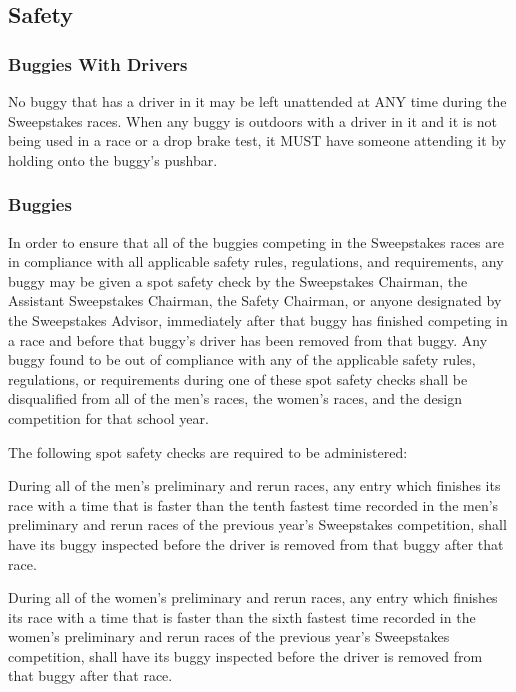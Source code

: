 \subsection{Safety}

\subsubsection{Buggies With Drivers}

No buggy that has a driver in it may be left unattended at ANY time during the Sweepstakes races. When any buggy is outdoors with a driver in it and it is not being used in a race or a drop brake test, it MUST have someone attending it by holding onto the buggy's pushbar.

\subsubsection{Buggies}

In order to ensure that all of the buggies competing in the Sweepstakes races are in compliance with all applicable safety rules, regulations, and requirements, any buggy may be given a spot safety check by the Sweepstakes Chairman, the Assistant Sweepstakes Chairman, the Safety Chairman, or anyone designated by the Sweepstakes Advisor, immediately after that buggy has finished competing in a race and before that buggy's driver has been removed from that buggy. Any buggy found to be out of compliance with any of the applicable safety rules, regulations, or requirements during one of these spot safety checks shall be disqualified from all of the men's races, the women's races, and the design competition for that school year.

The following spot safety checks are required to be administered:

During all of the men's preliminary and rerun races, any entry which finishes its race with a time that is faster than the tenth fastest time recorded in the men's preliminary and rerun races of the previous year's Sweepstakes competition, shall have its buggy inspected before the driver is removed from that buggy after that race.

During all of the women's preliminary and rerun races, any entry which finishes its race with a time that is faster than the sixth fastest time recorded in the women's preliminary and rerun races of the previous year's Sweepstakes competition, shall have its buggy inspected before the driver is removed from that buggy after that race.

